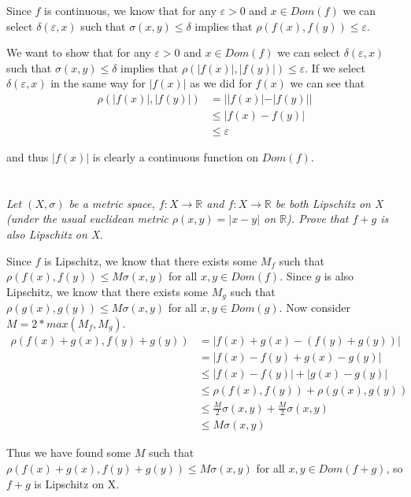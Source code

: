 \documentclass[]{article}
\newcommand{\reals}{\mathbb{R}}
\begin{document}
		Since $f$ is continuous, we know that for any $\varepsilon > 0$ and $x \in Dom(f)$ we can select $\delta(\varepsilon, x)$ such that $\sigma(x, y) \leq \delta$ implies that $\rho(f(x), f(y)) \leq \varepsilon$. 

		We want to show that for any $\varepsilon > 0$ and $x \in Dom(f)$ we can select $\delta(\varepsilon, x)$ such that $\sigma(x, y) \leq \delta$ implies that $\rho(|f(x)|, |f(y)|) \leq \varepsilon$. If we select $\delta(\varepsilon, x)$ in the same way for $|f(x)|$ as we did for $f(x)$ we can see that 
		\begin{align*}
			\rho(|f(x)|, |f(y)|) &= ||f(x)| - |f(y)|| \\
			&\leq |f(x) - f(y)| \\ %
			&\leq \varepsilon
		\end{align*}

		and thus $|f(x)|$ is clearly a continuous function on $Dom(f)$. 

	\section{}
		\textit{Let $(X, \sigma)$ be a metric space, $f : X \to \reals$ and $f : X \to \reals$ be both Lipschitz on X (under the usual euclidean metric $\rho(x, y) = |x - y|$ on $\reals$). Prove that $f + g$ is also Lipschitz on X.}

		Since $f$ is Lipschitz, we know that there exists some $M_f$ such that $\rho(f(x), f(y)) \leq M \sigma(x, y)$ for all $x, y \in Dom(f)$. Since $g$ is also Lipschitz, we know that there exists some $M_g$ such that $\rho(g(x), g(y)) \leq M \sigma(x, y)$ for all $x, y \in Dom(g)$. Now consider $M = 2 * max(M_f, M_g)$. 
		\begin{align*}
			\rho(f(x) + g(x), f(y) + g(y)) &= |f(x) + g(x) - (f(y) + g(y))|& \\
			&= |f(x) - f(y) + g(x) - g(y)| \\
			&\leq |f(x) - f(y)| + |g(x) - g(y)| \\
			&\leq \rho(f(x), f(y)) + \rho(g(x), g(y)) \\
			&\leq \frac{M}{2}\sigma(x, y) + \frac{M}{2}\sigma(x, y) \\
			&\leq M \sigma(x, y) 
		\end{align*}

		Thus we have found some $M$ such that $\rho(f(x) + g(x), f(y) + g(y)) \leq M \sigma(x, y)$ for all $x, y \in Dom(f + g)$, so $f + g$ is Lipschitz on X. 
\end{document}

